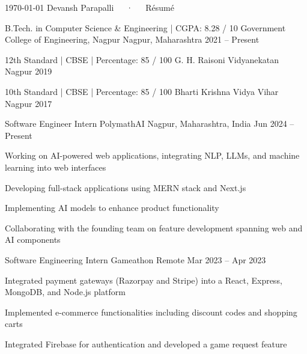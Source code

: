 \documentclass[11pt, a4paper]{awesome-cv}
\begin{document}
\makecvheader

\makecvfooter
  {\today}
  {Devansh Parapalli~~~·~~~Résumé}
  {\thepage}


\begin{cventries}

\cventry
  {B.Tech. in Computer Science \& Engineering | CGPA: 8.28 / 10}
  {Government College of Engineering, Nagpur}
  {Nagpur, Maharashtra}
  {2021 -- Present}
  {}

\cventry
  {12th Standard | CBSE | Percentage: 85 / 100}
  {G. H. Raisoni Vidyanekatan}
  {Nagpur}
  {2019}
  {}

\cventry
  {10th Standard | CBSE | Percentage: 85 / 100}
  {Bharti Krishna Vidya Vihar}
  {Nagpur}
  {2017}
  {}

\end{cventries}


\begin{cventries}

\cventry
  {Software Engineer Intern}
  {PolymathAI}
  {Nagpur, Maharashtra, India}
  {Jun 2024 -- Present}
  {
    \begin{cvitems}
      \item {Working on AI-powered web applications, integrating NLP, LLMs, and machine learning into web interfaces}
      \item {Developing full-stack applications using MERN stack and Next.js}
      \item {Implementing AI models to enhance product functionality}
      \item {Collaborating with the founding team on feature development spanning web and AI components}
    \end{cvitems}
  }

  \vskip 0.35cm

\cventry
  {Software Engineering Intern}
  {Gameathon}
  {Remote}
  {Mar 2023 -- Apr 2023}
  {
    \begin{cvitems}
      \item {Integrated payment gateways (Razorpay and Stripe) into a React, Express, MongoDB, and Node.js platform}
      \item {Implemented e-commerce functionalities including discount codes and shopping carts}
      \item {Integrated Firebase for authentication and developed a game request feature}
    \end{cvitems}
  }

\end{cventries}
\end{document}
